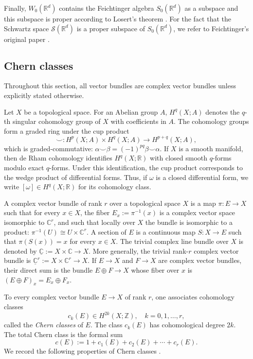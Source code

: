 \documentclass[reqno,a4paper,12pt]{amsart}
\numberwithin{equation}{section}
\def\R{{\mathbb R}}
\newcommand{\Rd}{{\R^d}}
\newcommand\1{\mathds{1}}
\begin{document}
Finally, $W_0(\Rd)$ contains the Feichtinger algebra $S_0(\Rd)$ as a subspace and this subspace is proper according to Losert's theorem \cite[Theorem 2]{losert1980characterization}. For the fact that the Schwartz space $\mathcal{S}(\Rd)$ is a proper subspace of $S_0(\Rd)$, we refer to Feichtinger's original paper \cite{feichtinger1981new}.


\subsection{Chern classes}

Throughout this section, all vector
bundles are complex vector bundles unless explicitly stated otherwise.

\medskip
Let $X$ be a topological space. For an Abelian group $A$,
$
H^q(X;A)
$
denotes the $q$-th singular cohomology group of $X$ with coefficients in $A$.
The cohomology groups form a graded ring under the cup product
$$
\smile:
H^p(X;A)\times H^q(X;A)\to H^{p+q}(X;A),
$$
which is graded-commutative: $\alpha\smile\beta
=
(-1)^{pq}\beta\smile\alpha$.
If $X$ is a smooth manifold, then de Rham cohomology identifies
$H^q(X;\mathbb R)$ with closed smooth $q$-forms modulo exact $q$-forms.
Under this identification, the cup product corresponds to the wedge product
of differential forms. Thus, if $\omega$ is a closed differential form, we
write
$
[\omega]\in H^q(X;\mathbb R)
$
for its cohomology class.


\medskip
A complex vector bundle of rank $r$ over a topological space $X$ is a map
$
\pi:E\to X
$
such that for every $x\in X$, the fiber
$
E_x:=\pi^{-1}(x)
$
is a complex vector space isomorphic to $\mathbb C^r$, and such that locally
over $X$ the bundle is isomorphic to a product:
$
\pi^{-1}(U)\cong U\times\mathbb C^r.
$
A section of $E$ is a continuous map
$
S:X\to E
$
such that
$
\pi(S(x))=x
$
for every $x\in X$.
The trivial complex line bundle over $X$ is denoted by
$
\underline{\mathbb C}:=X\times\mathbb C\to X.
$
More generally, the trivial rank-$r$ complex vector bundle is
$
\underline{\mathbb C}^r:=X\times\mathbb C^r\to X.
$
If $E\to X$ and $F\to X$ are complex vector bundles, their direct sum is the
bundle
$
E\oplus F\to X
$
whose fiber over $x$ is
$
(E\oplus F)_x=E_x\oplus F_x.
$

\medskip
To every complex vector bundle $E\to X$ of rank $r$, one associates cohomology
classes
$$
c_k(E)\in H^{2k}(X;\mathbb Z),
\quad k=0,1,\dots,r,
$$
called the \emph{Chern classes} of $E$. The class $c_k(E)$ has cohomological degree
$2k$.
The total Chern class is the formal sum
$$
c(E):=1+c_1(E)+c_2(E)+\cdots+c_r(E).
$$
We record the following properties of Chern classes \cite[Chapter 14]{milnor1974characteristic}.
\end{document}
